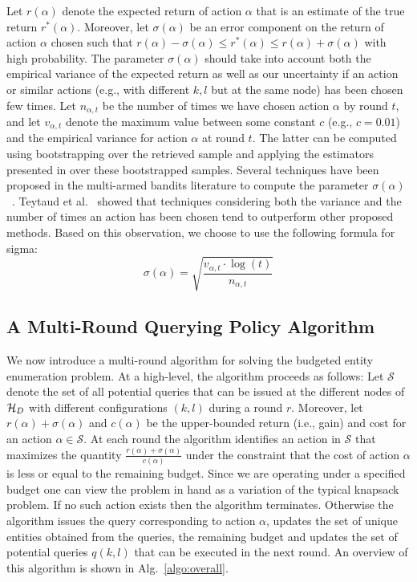 Let $r(\alpha)$ denote the expected return of action $\alpha$ that is an estimate of the true return $r^*(\alpha)$. Moreover, let $\sigma(\alpha)$ be an error component on the return of action $\alpha$ chosen such that $r(\alpha) - \sigma(\alpha) \leq r^*(\alpha) \leq r(\alpha) + \sigma(\alpha)$ with high probability. The parameter $\sigma(\alpha)$ should take into account both the empirical variance of the expected return as well as our uncertainty if an action or similar actions (e.g., with different $k, l$ but at the same node) has been chosen few times. Let $n_{\alpha,t}$ be the number of times we have chosen action $\alpha$ by round $t$, and let $v_{\alpha,t}$ denote the maximum value between some constant $c$ (e.g., $c = 0.01$) and the empirical variance for action $\alpha$ at round $t$. The latter can be computed using bootstrapping over the retrieved sample and applying the estimators presented in  over these bootstrapped samples. Several techniques have been proposed in the multi-armed bandits literature to compute the parameter $\sigma(\alpha)$~\cite{teytaud:inria-00173263}. Teytaud et al.~\cite{teytaud:inria-00173263} showed that techniques considering both the variance and the number of times an action has been chosen tend to outperform other proposed methods. \iftr Based on this observation, we choose to use the following formula for sigma:
\begin{equation}
\label{eq:upper}
\sigma(\alpha) = \sqrt{\frac{v_{\alpha,t}\cdot\log(t)}{n_{\alpha,t}}}
\end{equation}
\fi

\subsection{A Multi-Round Querying Policy Algorithm}
\label{sec:heuristic}
We now introduce a multi-round algorithm for solving the budgeted entity enumeration problem. At a high-level, the algorithm proceeds as follows: Let $\mathcal{S}$ denote the set of all potential queries that can be issued at the different nodes of $\mathcal{H}_D$ with different configurations $(k,l)$ during a round $r$. Moreover, let $r(\alpha) + \sigma(\alpha)$ and $c(\alpha)$ be the upper-bounded return (i.e., gain) and cost for an action $\alpha \in \mathcal{S}$. At each round the algorithm identifies an action in $\mathcal{S}$ that maximizes the quantity $\frac{r(\alpha) + \sigma(\alpha)}{c(\alpha)}$ under the constraint that the cost of action $\alpha$ is less or equal to the remaining budget. Since we are operating under a specified budget one can view the problem in hand as a variation of the typical knapsack problem. If no such action exists then the algorithm terminates. Otherwise the algorithm issues the query corresponding to action $\alpha$, updates the set of unique entities obtained from the queries, the remaining budget and updates the set of potential queries $q(k,l)$ that can be executed in the next round.  An overview of this algorithm is shown in Alg.~\ref{algo:overall}. 

